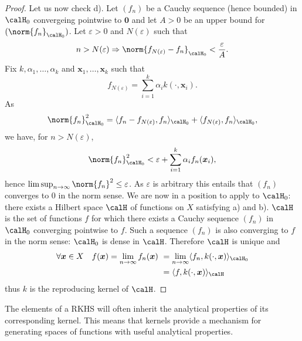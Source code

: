\begin{proof}
    Let us now check d). Let $(f_n)$ be a Cauchy sequence (hence bounded) in $\calH_0$ convergeing pointwise to $\bm{0}$ and let $A>0$ be an upper bound for $(\norm{f_n}_{\calH_0})$. Let $\varepsilon > 0$ and $N (\varepsilon)$ such that
    \begin{equation*}
        n > N (\varepsilon) \Rightarrow \norm{f_{N(\varepsilon)} - f_n}_{\calH_0} < \frac{\varepsilon}{A}.
    \end{equation*}
    Fix $k,\alpha_1 , \ldots , \alpha_k$ and $\bm{x}_1 , \ldots , \bm{x}_k$ such that
    \begin{equation*}
        f_{N(\varepsilon)} = \sum_{i=1}^{k} \alpha_i k (\cdot , \bm{x}_i).
    \end{equation*}
    As
    \begin{equation*}
        \norm{f_n}_{\calH_0}^2 = \langle f_n - f_{N(\varepsilon)}, f_n \rangle_{\calH_0} + \langle f_{N(\varepsilon)} , f_n \rangle_{\calH_0},
    \end{equation*}
    we have, for $n > N(\varepsilon)$,
    \begin{equation*}
        \norm{f_n}_{\calH_0}^2 < \varepsilon + \sum_{i=1}^k \alpha_i f_n (\bm{x}_i),
    \end{equation*}
    hence $\limsup_{n \to \infty} \norm{f_n}^2 \leq \varepsilon$. As $\varepsilon$ is arbitrary this entails that $(f_n)$ converges to $0$ in the norm sense. We are now in a position to apply  to $\calH_0$: there exists a Hilbert space $\calH$ of functions on $X$ satisfying a) and b). $\calH$ is the set of functions $f$ for which there exists a Cauchy sequence $(f_n)$ in $\calH_0$ converging pointwise to $f$. Such a sequence $(f_n)$ is also converging to $f$ in the norm sense: $\calH_0$ is dense in $\calH$. Therefore $\calH$ is unique and
    \begin{align*}
        \forall \bm{x} \in X \quad f(\bm{x}) = \lim_{n \to \infty} f_n (\bm{x}) \
         & = \lim_{n \to \infty} \langle f_n , k (\cdot , \bm{x}) \rangle_{\calH_0} \\
         & = \langle f , k(\cdot , \bm{x}) \rangle_{\calH}
    \end{align*}
    thus $k$ is the reproducing kernel of $\calH$.
\end{proof}

The elements of a RKHS will often inherit the analytical properties of its corresponding kernel. This means that kernels provide a mechanism for generating spaces of functions with useful analytical properties.